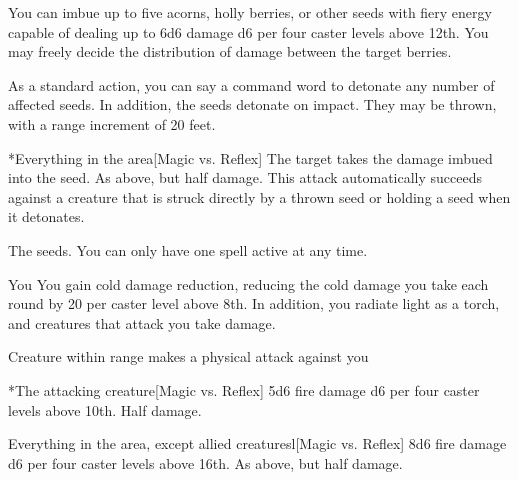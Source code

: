 \spellline
\spelleffect You can imbue up to five acorns, holly berries, or other seeds with fiery energy capable of dealing up to 6d6 damage \add d6 per four caster levels above 12th. You may freely decide the distribution of damage between the target berries.

As a standard action, you can say a command word to detonate any number of affected seeds. In addition, the seeds detonate on impact. They may be thrown, with a range increment of 20 feet.
\begin{spelltarget}*{Everything in the area}[Magic vs. Reflex]
    \spellsuccess The target takes the damage imbued into the seed.
    \spellfailure As above, but half damage.
    \spellspecial This attack automatically succeeds against a creature that is struck directly by a thrown seed or holding a seed when it detonates.
\end{spelltarget}
 The seeds.
\spellnotes You can only have one  spell active at any time.

\spelldur{\durshort \dismissable}
\begin{spelltarget}{You}
    \spelleffect You gain cold damage reduction, reducing the cold damage you take each round by 20  per caster level above 8th. In addition, you radiate light as a torch, and creatures that attack you take damage.
\end{spelltarget}
\begin{spelltrigger}{Creature within \rngclose range makes a physical attack against you}
    \begin{spelltarget}*{The attacking creature}[Magic vs. Reflex]
        \spellsuccess 5d6 fire damage \add d6 per four caster levels above 10th.
        \spellfailure Half damage.
    \end{spelltarget}
\end{spelltrigger}

\begin{spelltargets}{Everything in the area, except allied creatures}l[Magic vs. Reflex]
    \spellsuccess 8d6 fire damage \add d6 per four caster levels above 16th.
    \spellfailure As above, but half damage.
\end{spelltargets}


